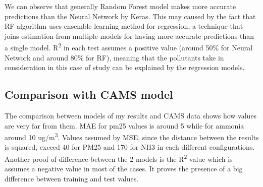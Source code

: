 We can observe that generally Random Forest model makes more accurate predictions than the Neural Network by Keras. This may caused by the fact that RF algorithm uses ensemble learning method for regression, a technique that joins estimation from multiple models for having more accurate predictions than a single model. 
R\textsuperscript{2} in each test assumes a positive value (around 50\% for Neural Network and around 80\% for RF), meaning that the pollutants take in consideration in this case of study can be explained by the regression models. 
\subsection{Comparison with CAMS model}
The comparison between models of my results and CAMS data shows how values are very far from them. MAE for pm25 values is around 5 while for ammonia around 10 ug/m\textsuperscript{3}. Values assumed by MSE, since the distance between the results is squared, exceed 40 for PM25 and 170 for NH3 in each different configurations.
Another proof of difference between the 2 models is the R\textsuperscript{2} value which is assumes a negative value in most of the cases. It proves the presence of a big difference between training and test values. 

